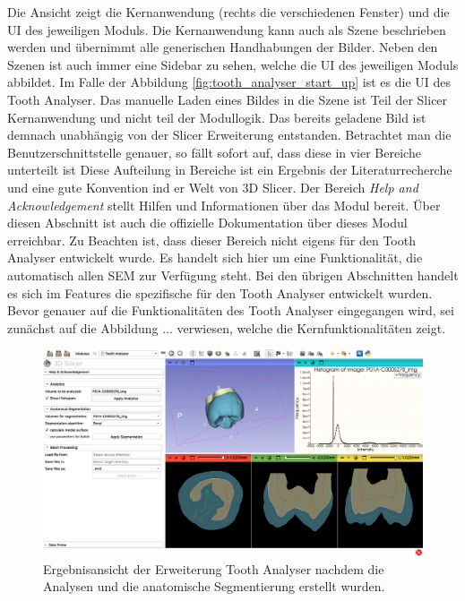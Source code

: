 Die Ansicht zeigt die Kernanwendung (rechts die verschiedenen Fenster) und die
\ac{UI} des jeweiligen Moduls. Die Kernanwendung kann auch als Szene beschrieben
werden und übernimmt alle generischen Handhabungen der Bilder. Neben den Szenen ist
auch immer eine Sidebar zu sehen, welche die \ac{UI} des jeweiligen Moduls abbildet.
Im Falle der Abbildung \ref{fig:tooth_analyser_start_up} ist es die \ac{UI} des Tooth
Analyser. Das manuelle Laden eines Bildes in die Szene ist Teil der Slicer
Kernanwendung und nicht teil der Modullogik. Das bereits geladene Bild ist demnach
unabhängig von der Slicer Erweiterung entstanden. Betrachtet man die
Benutzerschnittstelle genauer, so fällt sofort auf, dass diese in vier Bereiche
unterteilt ist Diese Aufteilung in Bereiche ist ein Ergebnis der
Literaturrecherche und eine gute Konvention ind er Welt von 3D Slicer. Der Bereich
\textit{Help and Acknowledgement} stellt Hilfen und Informationen über das Modul
bereit. Über diesen Abschnitt ist auch die offizielle Dokumentation über dieses Modul
erreichbar. Zu Beachten ist, dass dieser Bereich nicht eigens für den Tooth Analyser
entwickelt wurde. Es handelt sich hier um eine Funktionalität, die automatisch allen
\ac{SEM} zur Verfügung steht. Bei den übrigen Abschnitten handelt es sich im Features
die spezifische für den Tooth Analyser entwickelt wurden. Bevor genauer auf die
Funktionalitäten des Tooth Analyser eingegangen wird, sei zunächst auf die Abbildung
... verwiesen, welche die Kernfunktionalitäten zeigt.

\begin{figure}[h]
	\centering
	\includegraphics[scale=0.2, width=\textwidth]{img/toothAnalyserFullView.png}
	\caption{Ergebnisansicht der Erweiterung Tooth Analyser nachdem die Analysen
	und die anatomische Segmentierung erstellt wurden.}
	\label{fig:tooth_analyser_full_view}
\end{figure}

